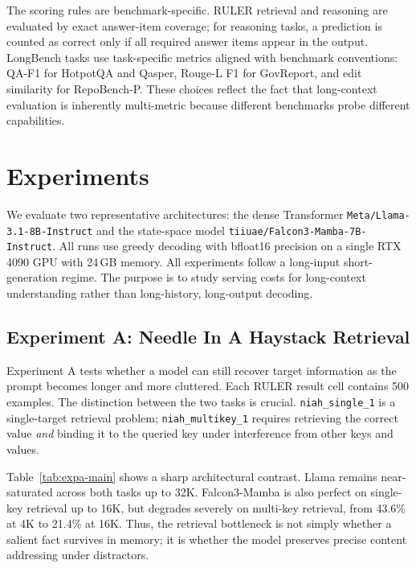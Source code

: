 \documentclass[11pt]{article}
\begin{document}
The scoring rules are benchmark-specific. RULER retrieval and reasoning are evaluated by exact answer-item coverage; for reasoning tasks, a prediction is counted as correct only if all required answer items appear in the output. LongBench tasks use task-specific metrics aligned with benchmark conventions: QA-F1 for HotpotQA and Qasper, Rouge-L F1 for GovReport, and edit similarity for RepoBench-P. These choices reflect the fact that long-context evaluation is inherently multi-metric because different benchmarks probe different capabilities.

\section{Experiments}
\label{sec:experiments}

We evaluate two representative architectures: the dense Transformer \texttt{Meta/Llama-3.1-8B-Instruct} and the state-space model \texttt{tiiuae/Falcon3-Mamba-7B-Instruct}. All runs use greedy decoding with bfloat16 precision on a single RTX 4090 GPU with 24\,GB memory. All experiments follow a long-input short-generation regime. The purpose is to study serving costs for long-context understanding rather than long-history, long-output decoding.

\subsection{Experiment A: Needle In A Haystack Retrieval }
Experiment A tests whether a model can still recover target information as the prompt becomes longer and more cluttered. Each RULER result cell contains 500 examples. The distinction between the two tasks is crucial. \texttt{niah\_single\_1} is a single-target retrieval problem; \texttt{niah\_multikey\_1} requires retrieving the correct value \emph{and} binding it to the queried key under interference from other keys and values.

Table~\ref{tab:expa-main} shows a sharp architectural contrast. Llama remains near-saturated across both tasks up to 32K. Falcon3-Mamba is also perfect on single-key retrieval up to 16K, but degrades severely on multi-key retrieval, from 43.6\% at 4K to 21.4\% at 16K. Thus, the retrieval bottleneck is not simply whether a salient fact survives in memory; it is whether the model preserves precise content addressing under distractors.
\end{document}
